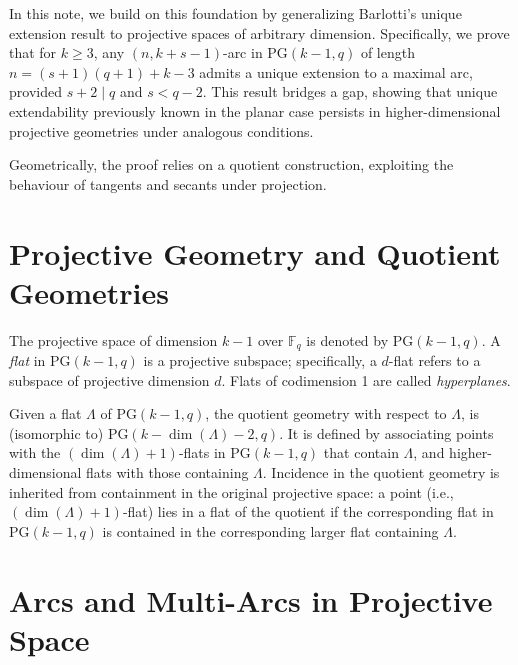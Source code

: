 \documentclass[letterpaper, 12pt]{article}
\newcommand{\F}{\mathbb{F}}
\begin{document}
In this note, we build on this foundation by generalizing Barlotti’s unique extension result to projective spaces of arbitrary dimension. Specifically, we prove that for \( k \ge 3 \), any \((n, k+s-1)\)-arc in PG\((k - 1, q)\) of length \( n = (s+1)(q+1) + k - 3 \) admits a unique extension to a maximal arc, provided \( s + 2 \mid q \) and \( s < q - 2 \). This result bridges a gap, showing that unique extendability previously known in the planar case persists in higher-dimensional projective geometries under analogous conditions.

Geometrically, the proof relies on a quotient construction, exploiting the behaviour of tangents and secants under projection. 



\section*{Projective Geometry and Quotient Geometries}

The projective space of dimension \( k-1 \) over \( \F_q \) is denoted by PG\((k - 1, q)\). A \emph{flat} in PG\((k - 1, q)\) is a projective subspace; specifically, a \( d \)-flat refers to a subspace of projective dimension \( d \). Flats of codimension 1 are called \emph{hyperplanes}.

Given a flat \( \Lambda \) of PG\((k - 1, q)\), the quotient geometry with respect to \( \Lambda \), is (isomorphic to)   PG\((k - \dim(\Lambda) - 2, q)\). It is defined by associating  points with the \((\dim(\Lambda)+1)\)-flats in PG\((k - 1, q)\) that contain \( \Lambda \), and higher-dimensional flats with those containing \( \Lambda \).
Incidence in the quotient geometry is inherited from containment in the original projective space: a point (i.e., \((\dim(\Lambda)+1)\)-flat) lies in a flat of the quotient if the corresponding flat in PG\((k - 1, q)\) is contained in the corresponding larger flat containing \( \Lambda \).

\section*{Arcs and Multi-Arcs in Projective Space}
\end{document}
